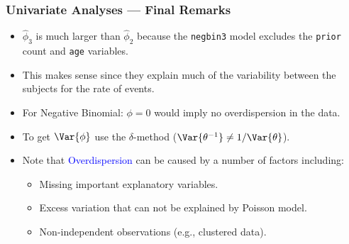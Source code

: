 \documentclass[oneside]{book}\usepackage[]{graphicx}\usepackage[svgnames]{xcolor}
\begin{document}
\subsubsection*{Univariate Analyses --- Final Remarks}
\begin{itemize}
    \item $ \hat{\phi}_3 $ is much larger than $ \hat{\phi}_2 $ because the \texttt{negbin3} model excludes the \texttt{prior} count
          and \texttt{age} variables.
    \item This makes sense since they explain much of the variability between the subjects
          for the rate of events.
    \item For Negative Binomial: $ \phi=0 $ would imply no overdispersion in the data.
    \item To get $ \Var{\phi} $ use the $ \delta $-method ($ \Var{\theta^{-1}}\ne 1/\Var{\theta} $).
    \item Note that \textcolor{Blue}{Overdispersion} can be caused by a number of factors including:
          \begin{itemize}
              \item Missing important explanatory variables.
              \item Excess variation that can not be explained by Poisson model.
              \item Non-independent observations (e.g., clustered data).
          \end{itemize}
\end{itemize}
\end{document}

